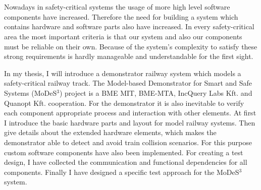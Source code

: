 \chapter{\bevezetes}
Nowadays in safety-critical systems the usage of more high level software components have increased. Therefore the need for building a system which contains hardware and software parts also have increased. In every safety-critical area the most important criteria is that our system and also our components must be reliable on their own. Because of the system's complexity to satisfy these strong requirements is hardly manageable and understandable for the first sight. 


In my thesis, I will introduce a demonstrator railway system which models a safety-critical railway track. The Model-based Demonstrator for Smart and Safe Systems (MoDeS$^3$) project is a BME MIT, BME-MTA, IncQuery Labs Kft. and Quanopt Kft. cooperation. For the demonstrator it is also inevitable to verify each component appropriate process and interaction with other elements. At first I introduce the basic hardware parts and layout for model railway systems. Then give details about the extended hardware elements, which makes the demonstrator able to detect and avoid train collision scenarios. For this purpose custom software components have also been implemented. For creating a test design, I have collected the communication and functional dependencies for all components. Finally I have designed a specific test approach for the MoDeS$^3$ system.


